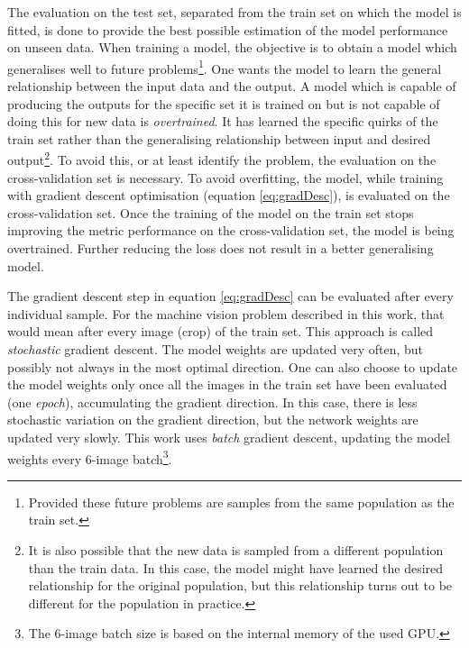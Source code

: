 \par{
    The evaluation on the test set, separated from the train set on which the model is fitted, is done to provide the best possible estimation of the model performance on unseen data.
    When training a model, the objective is to obtain a model which generalises well to future problems\footnote{
        Provided these future problems are samples from the same population as the train set.
    }. One wants the model to learn the general relationship between the input data and the output.
    A model which is capable of producing the outputs for the specific set it is trained on but is not capable of doing this for new data is \textit{overtrained}.
    It has learned the specific quirks of the train set rather than the generalising relationship between input and desired output\footnote{
        It is also possible that the new data is sampled from a different population than the train data.
        In this case, the model might have learned the desired relationship for the original population, but this relationship turns out to be different for the population in practice.
        }.
    To avoid this, or at least identify the problem, the evaluation on the cross-validation set is necessary.
    To avoid overfitting, the model, while training with gradient descent optimisation (equation \ref{eq:gradDesc}), is evaluated on the cross-validation set.
    Once the training of the model on the train set stops improving the metric performance on the cross-validation set, the model is being overtrained.
    Further reducing the loss does not result in a better generalising model.
}
\par{
    The gradient descent step in equation \ref{eq:gradDesc} can be evaluated after every individual sample.
    For the machine vision problem described in this work, that would mean after every image (crop) of the train set.
    This approach is called \textit{stochastic} gradient descent. The model weights are updated very often, but possibly not always in the most optimal direction.
    One can also choose to update the model weights only once all the images in the train set have been evaluated (one \textit{epoch}), accumulating the gradient direction.
    In this case, there is less stochastic variation on the gradient direction, but the network weights are updated very slowly.
    This work uses \textit{batch} gradient descent, updating the model weights every 6-image batch\footnote{The 6-image batch size is based on the internal memory of the used GPU.}.
}
